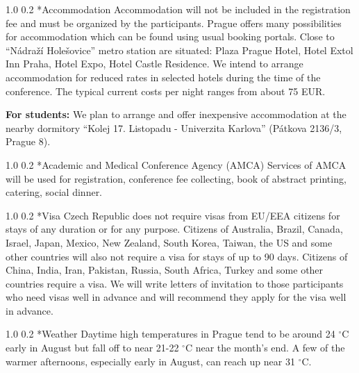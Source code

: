 \documentclass[12pt]{extarticle}
\makeatletter
\renewcommand{\section}{\@startsection{section}{1}{0mm}
{1.0\baselineskip}%
{0.2\baselineskip}%
{\normalfont\large\bfseries}}%
\makeatother
\begin{document}
\section*{Accommodation}
\noindent
Accommodation will not be included in the registration fee and must be organized by the participants.
Prague offers many possibilities for accommodation which can be found using usual booking portals. Close
to “Nádraží Holešovice” metro station are situated: Plaza Prague Hotel, Hotel Extol Inn Praha, Hotel Expo, Hotel
Castle Residence. We intend to arrange accommodation for reduced rates in selected hotels during the time of
the conference. The typical current costs per night ranges from about 75 EUR.

{\bf For students:} We plan to arrange and offer inexpensive accommodation at the nearby dormitory ``Kolej 17.
Listopadu - Univerzita Karlova'' (Pátkova 2136/3, Prague 8).

\section*{Academic and Medical Conference Agency (AMCA)}
\noindent
Services of AMCA will be used for registration, conference fee collecting, book of abstract printing, catering, social dinner.

\section*{Visa}
\noindent
%
Czech Republic does not require visas from EU/EEA citizens for stays of any duration or for any purpose.
Citizens of Australia, Brazil, Canada, Israel, Japan, Mexico, New Zealand, South Korea, Taiwan, the US and
some other countries will also not require a visa for stays of up to 90 days. Citizens of China, India, Iran,
Pakistan, Russia, South Africa, Turkey and some other countries require a visa. We will write letters of invitation
to those participants who need visas well in advance and will recommend they apply for the visa well in advance.

\section*{Weather}
\noindent
%
Daytime high temperatures in Prague tend to be around 24 ${}^\circ$C early in August but fall off to near
21-22 ${}^\circ$C near the month's end. A few of the warmer afternoons, especially early in August, can reach
up near 31 ${}^\circ$C.
\end{document}
